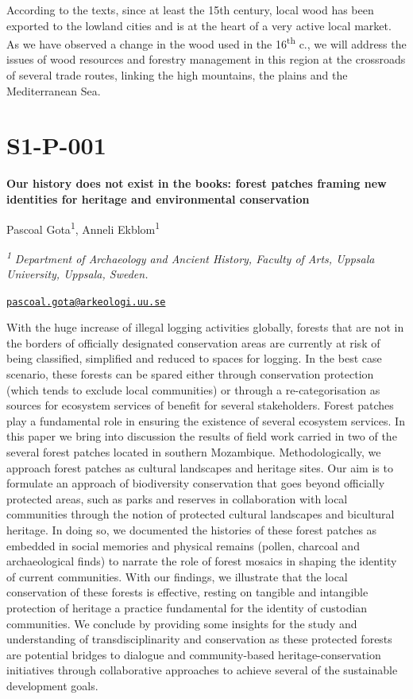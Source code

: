 \documentclass[
]{book}
\begin{document}
According to the texts, since at least the 15th century, local wood has been exported to the lowland cities and is at the heart of a very active local market. As we have observed a change in the wood used in the 16\textsuperscript{th} c., we will address the issues of wood resources and forestry management in this region at the crossroads of several trade routes, linking the high mountains, the plains and the Mediterranean Sea.

\hypertarget{s1-p-001}{%
\section*{S1-P-001}\label{s1-p-001}}

\textbf{Our history does not exist in the books: forest patches framing new identities for heritage and environmental conservation}

Pascoal Gota\textsuperscript{1}, Anneli Ekblom\textsuperscript{1}

\textsuperscript{\emph{1}} \emph{Department of Archaeology and Ancient History, Faculty of Arts, Uppsala University, Uppsala, Sweden.}

\href{mailto:pascoal.gota@arkeologi.uu.se}{\nolinkurl{pascoal.gota@arkeologi.uu.se}}

With the huge increase of illegal logging activities globally, forests that are not in the borders of officially designated conservation areas are currently at risk of being classified, simplified and reduced to spaces for logging. In the best case scenario, these forests can be spared either through conservation protection (which tends to exclude local communities) or through a re-categorisation as sources for ecosystem services of benefit for several stakeholders. Forest patches play a fundamental role in ensuring the existence of several ecosystem services. In this paper we bring into discussion the results of field work carried in two of the several forest patches located in southern Mozambique. Methodologically, we approach forest patches as cultural landscapes and heritage sites. Our aim is to formulate an approach of biodiversity conservation that goes beyond officially protected areas, such as parks and reserves in collaboration with local communities through the notion of protected cultural landscapes and bicultural heritage. In doing so, we documented the histories of these forest patches as embedded in social memories and physical remains (pollen, charcoal and archaeological finds) to narrate the role of forest mosaics in shaping the identity of current communities. With our findings, we illustrate that the local conservation of these forests is effective, resting on tangible and intangible protection of heritage a practice fundamental for the identity of custodian communities. We conclude by providing some insights for the study and understanding of transdisciplinarity and conservation as these protected forests are potential bridges to dialogue and community-based heritage-conservation initiatives through collaborative approaches to achieve several of the sustainable development goals.
\end{document}
